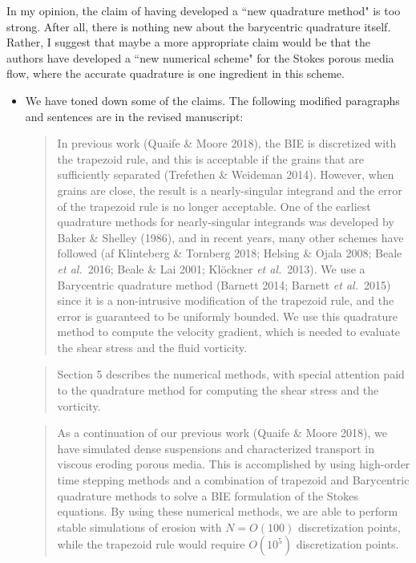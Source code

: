 \documentclass[11pt]{article}
\newcommand{\comment}[1]{{\color{blue} #1}}
\begin{document}
\noindent
\comment{In my opinion, the claim of having developed a ``new quadrature
method" is too strong. After all, there is nothing new about the
barycentric quadrature itself. Rather, I suggest that maybe a more
appropriate claim would be that the authors have developed a ``new
numerical scheme" for the Stokes porous media flow, where the accurate
quadrature is one ingredient in this scheme.}
\begin{itemize}
  \item We have toned down some of the claims. The following modified
    paragraphs and sentences are in the revised manuscript:
    \begin{quotation}
      \noindent
      In previous work (Quaife \& Moore 2018), the BIE is discretized
      with the trapezoid rule, and this is acceptable if the grains that
      are sufficiently separated (Trefethen \& Weideman 2014). However,
      when grains are close, the result is a nearly-singular integrand
      and the error of the trapezoid rule is no longer acceptable. One
      of the earliest quadrature methods for nearly-singular integrands
      was developed by Baker \& Shelley (1986), and in recent years,
      many other schemes have followed (af Klinteberg \& Tornberg 2018;
      Helsing \& Ojala 2008; Beale {\em et al.}~2016; Beale \& Lai 2001;
      Kl\"{o}ckner {\em et al.}~2013). We use a Barycentric quadrature
      method (Barnett 2014; Barnett {\em et al.}~2015) since it is a
      non-intrusive modification of the trapezoid rule, and the error is
      guaranteed to be uniformly bounded. We use this quadrature method
      to compute the velocity gradient, which is needed to evaluate the
      shear stress and the fluid vorticity.
    \end{quotation}

    \begin{quotation}
      \noindent
      Section 5 describes the numerical methods, with special attention
      paid to the quadrature method for computing the shear stress and
      the vorticity.
    \end{quotation}

    \begin{quotation}
      \noindent
      As a continuation of our previous work (Quaife \& Moore 2018), we
      have simulated dense suspensions and characterized transport in
      viscous eroding porous media. This is accomplished by using
      high-order time stepping methods and a combination of trapezoid
      and Barycentric quadrature methods to solve a BIE formulation of
      the Stokes equations. By using these numerical methods, we are
      able to perform stable simulations of erosion with $N = O(100)$
      discretization points, while the trapezoid rule would require
      $O(10^5)$ discretization points.
    \end{quotation}
\end{itemize}
\end{document}
